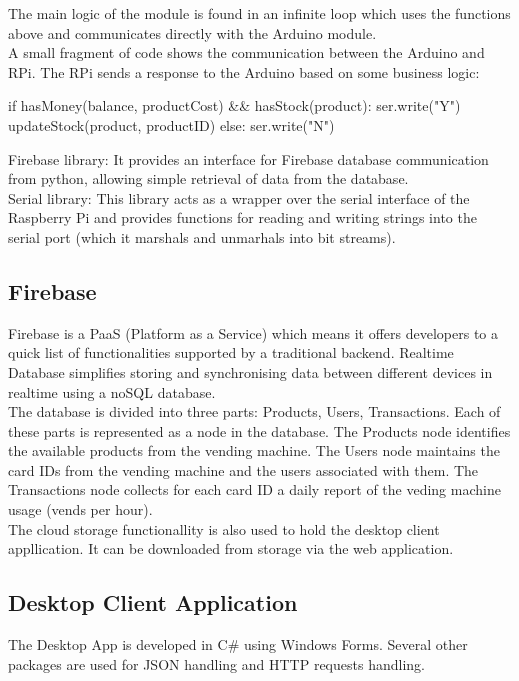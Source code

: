 \documentclass[a4paper,11pt]{article}
\begin{document}
The main logic of the module is found in an infinite loop which uses the functions above and communicates directly with the Arduino module.\\

A small fragment of code shows the communication between the Arduino and RPi. The RPi sends a response to the Arduino based on some business logic:
\begin{python}
if hasMoney(balance, productCost) && hasStock(product):
	ser.write("Y")
	updateStock(product, productID)
else:
	ser.write("N")
\end{python}

Firebase library: It provides an interface for Firebase database communication from python, allowing simple retrieval of data from the database.\\

Serial library: This library acts as a wrapper over the serial interface of the Raspberry Pi and provides functions for reading and writing strings into the serial port (which it marshals and unmarhals into bit streams).
\subsection{Firebase}

Firebase is a PaaS (Platform as a Service) which means it offers developers to a quick list of functionalities supported by a traditional backend.
Realtime Database simplifies storing and synchronising data between different devices in realtime using a noSQL database.\\

The database is divided into three parts: Products, Users, Transactions. Each of these parts is represented as a node in the database. The Products node identifies the available products from the vending machine. 
The Users node maintains the card IDs from the vending machine and the users associated with them. The Transactions node collects for each card ID a daily report of the veding machine usage (vends per hour).\\

The cloud storage functionallity is also used to hold the desktop client appllication. It can be downloaded from storage via the web application.
\subsection{Desktop Client Application}
The Desktop App is developed in C\# using Windows Forms. Several other packages are used for JSON handling and HTTP requests handling.\\
 
\end{document}
